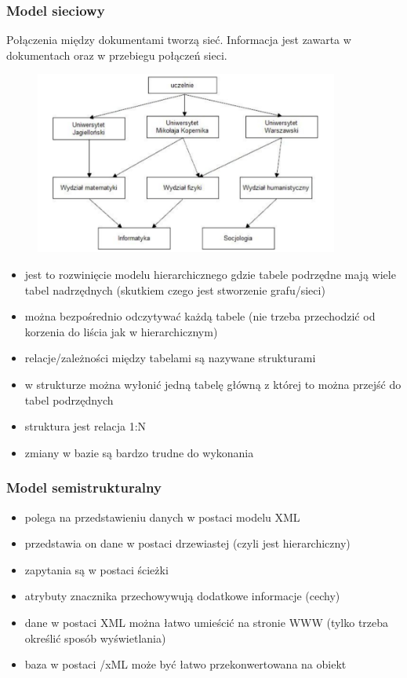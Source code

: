 \documentclass[a4paper,12pt,oneside]{book}
\begin{document}
			\subsubsection{Model sieciowy}
			Połączenia między dokumentami tworzą sieć. Informacja jest zawarta w dokumentach oraz w przebiegu połączeń sieci.
			\begin{figure}[h]
				\includegraphics[width=10cm]{modelsieciowy}
				\centering
			\end{figure}
			\begin{itemize}
				\itemsep 0em
				\item jest to rozwinięcie modelu hierarchicznego gdzie tabele podrzędne mają wiele tabel
				nadrzędnych (skutkiem czego jest stworzenie grafu/sieci)
				\item można bezpośrednio odczytywać każdą tabele (nie trzeba przechodzić od korzenia
				do liścia jak w hierarchicznym)
				\item relacje/zależności między tabelami są nazywane strukturami
				\item w strukturze można wyłonić jedną tabelę główną z której to można przejść do tabel
				podrzędnych
				\item struktura jest relacja 1:N
				\item zmiany w bazie są bardzo trudne do wykonania
			\end{itemize}
			\subsubsection{Model semistrukturalny}
			\begin{itemize}
				\itemsep 0em
				\item polega na przedstawieniu danych w postaci modelu XML		
				\item przedstawia on dane w postaci drzewiastej (czyli jest hierarchiczny)
				\item zapytania są w postaci ścieżki
				\item atrybuty znacznika przechowywują dodatkowe informacje (cechy)
				\item dane w postaci XML można łatwo umieścić na stronie WWW (tylko trzeba określić sposób wyświetlania)
				\item baza w postaci /xML może być łatwo przekonwertowana na obiekt
			\end{itemize}
			
\end{document}
